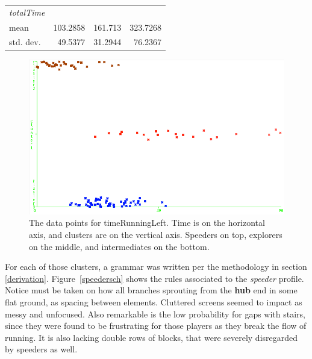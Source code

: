\documentclass[conference]{IEEEtran}
\begin{document}
\begin{table}
\begin{center}
\begin{tabular}{|l|r|r|r|}
\hline

\textit{totalTime} & & & \\
  mean                  &            103.2858  & 161.713  & 323.7268 \\
  std. dev.            &              49.5377  & 31.2944  & 76.2367 \\

\hline

\end{tabular}
\end{center}
\end{table}

\begin{figure}[htp]
\centerline{\includegraphics[width=0.9\columnwidth]{timeRunningLeft.png}}
\label{timeRunningLeft}
\caption{The data points for timeRunningLeft. Time is on the horizontal axis, and clusters are on the vertical axis. Speeders on top, explorers on the middle, and intermediates on the bottom.}
\end{figure}

For each of those clusters, a grammar was written per the methodology in section \ref{derivation}. Figure~\ref{speedersch} shows the rules associated to the \textit{speeder} profile. Notice must be taken on how all branches sprouting from the \textbf{hub} end in some flat ground, as spacing between elements. Cluttered screens seemed to impact as messy and unfocused. Also remarkable is the low probability for gaps with stairs, since they were found to be frustrating for those players as they break the flow of running. It is also lacking double rows of blocks, that were severely disregarded by speeders as well.
\end{document}
